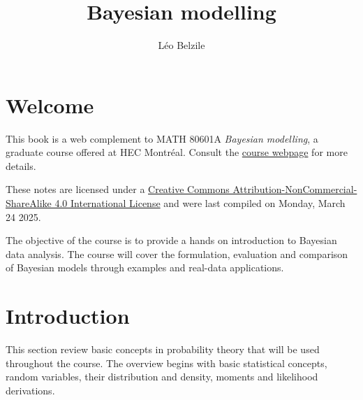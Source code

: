 \documentclass[
  11pt,
  letterpaper,
]{scrbook}
\title{Bayesian modelling}
\author{Léo Belzile}
\date{}
\renewcommand*\contentsname{Table of contents}
\newcommand\contentsname{Table of contents}
\theoremstyle{definition}
\theoremstyle{definition}
\theoremstyle{definition}
\theoremstyle{plain}
\theoremstyle{plain}
\theoremstyle{plain}
\theoremstyle{remark}
\begin{document}
\frontmatter
\maketitle

\renewcommand*\contentsname{Table of contents}
{
\setcounter{tocdepth}{2}
\tableofcontents
}

\mainmatter
{}

\chapter*{Welcome}\label{welcome}


This book is a web complement to MATH 80601A \emph{Bayesian modelling},
a graduate course offered at HEC Montréal. Consult the
\href{https://lbelzile.github.io/bayesmod}{course webpage} for more
details.

These notes are licensed under a
\href{http://creativecommons.org/licenses/by-nc-sa/4.0/}{Creative
Commons Attribution-NonCommercial-ShareAlike 4.0 International License}
and were last compiled on Monday, March 24 2025.

The objective of the course is to provide a hands on introduction to
Bayesian data analysis. The course will cover the formulation,
evaluation and comparison of Bayesian models through examples and
real-data applications.


\chapter{Introduction}\label{introduction}

This section review basic concepts in probability theory that will be
used throughout the course. The overview begins with basic statistical
concepts, random variables, their distribution and density, moments and
likelihood derivations.
\end{document}
